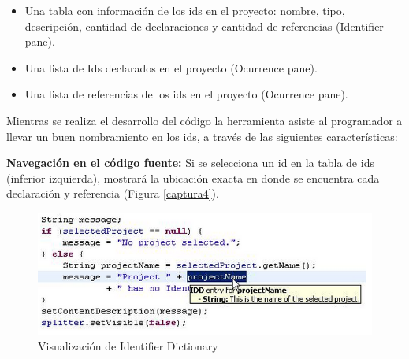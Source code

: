 \documentclass[a4paper,12pt]{report}
\begin{document}
\begin{itemize}
\itemsep0em%
\item Una tabla con información de los ids en el proyecto: nombre, tipo, descripción, cantidad de declaraciones y cantidad de referencias (Identifier pane).
\item Una lista de Ids declarados en el proyecto (Ocurrence pane).
\item Una lista de referencias de los ids en el proyecto (Ocurrence pane).
\end{itemize}

Mientras se realiza el desarrollo del código la herramienta asiste al programador a llevar un buen nombramiento en los ids, a través de las siguientes características:

\textbf{Navegación en el código fuente:} Si se selecciona un id en la tabla de ids (inferior izquierda), mostrará la ubicación exacta en donde se encuentra cada declaración y referencia (Figura \ref{captura4}).


%

\begin{figure}[t] %
\centerline{%
\includegraphics[scale= 0.70]{./idd_7.png}
}
\caption{Visualización de Identifier Dictionary}
\label{captura8}
\end{figure}
\end{document}
